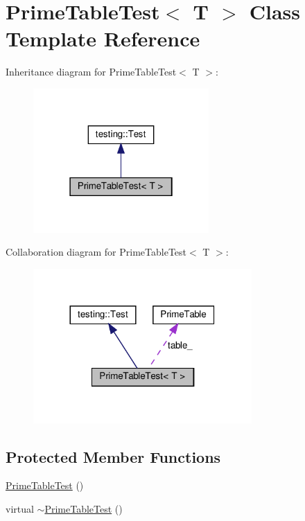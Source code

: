\hypertarget{class_prime_table_test}{}\section{Prime\+Table\+Test$<$ T $>$ Class Template Reference}
\label{class_prime_table_test}


Inheritance diagram for Prime\+Table\+Test$<$ T $>$\+:
\nopagebreak
\begin{figure}[H]
\begin{center}
\leavevmode
\includegraphics[width=190pt]{class_prime_table_test__inherit__graph}
\end{center}
\end{figure}


Collaboration diagram for Prime\+Table\+Test$<$ T $>$\+:
\nopagebreak
\begin{figure}[H]
\begin{center}
\leavevmode
\includegraphics[width=236pt]{class_prime_table_test__coll__graph}
\end{center}
\end{figure}
\subsection*{Protected Member Functions}
\begin{DoxyCompactItemize}
\item 
\hyperlink{class_prime_table_test_ab83d0b24b41bff1ace55f9a8d5ea6dcf}{Prime\+Table\+Test} ()
\item 
virtual \hyperlink{class_prime_table_test_a4fb27ce277675d58ea3f8db99e3bb2b4}{$\sim$\+Prime\+Table\+Test} ()
\end{DoxyCompactItemize}
